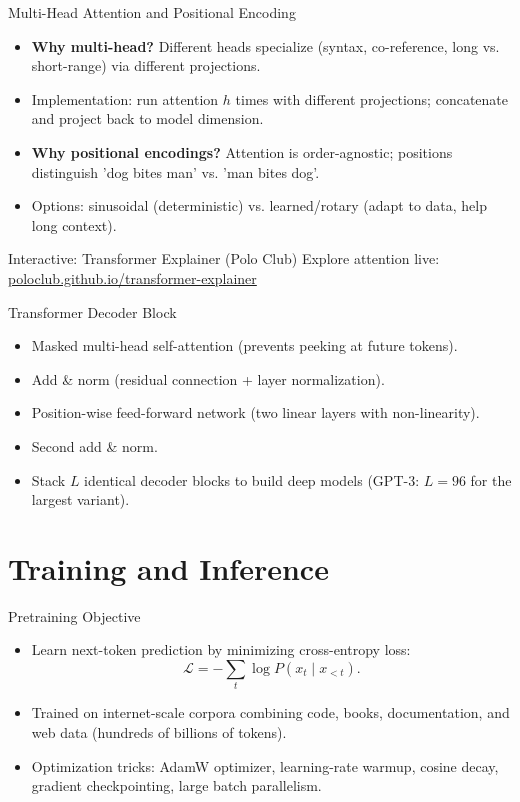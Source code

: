 \documentclass[aspectratio=169]{beamer}
\begin{document}
\begin{frame}{Multi-Head Attention and Positional Encoding}
  \begin{itemize}
    \item \textbf{Why multi-head?} Different heads specialize (syntax, co-reference, long vs. short-range) via different projections.
    \item Implementation: run attention $h$ times with different projections; concatenate and project back to model dimension.
    \item \textbf{Why positional encodings?} Attention is order-agnostic; positions distinguish 'dog bites man' vs. 'man bites dog'.
    \item Options: sinusoidal (deterministic) vs. learned/rotary (adapt to data, help long context).
  \end{itemize}
\end{frame}
\begin{frame}{Interactive: Transformer Explainer (Polo Club)}
  Explore attention live: \href{https://poloclub.github.io/transformer-explainer/}{poloclub.github.io/transformer-explainer}
\end{frame}

\begin{frame}{Transformer Decoder Block}
  \begin{itemize}
    \item Masked multi-head self-attention (prevents peeking at future tokens).
    \item Add \& norm (residual connection + layer normalization).
    \item Position-wise feed-forward network (two linear layers with non-linearity).
    \item Second add \& norm.
    \item Stack $L$ identical decoder blocks to build deep models (GPT-3: $L=96$ for the largest variant).
  \end{itemize}
\end{frame}

\section{Training and Inference}

\begin{frame}{Pretraining Objective}
  \begin{itemize}
    \item Learn next-token prediction by minimizing cross-entropy loss:
      \[
        \mathcal{L} = -\sum_{t} \log P(x_t \mid x_{<t}).
      \]
    \item Trained on internet-scale corpora combining code, books, documentation, and web data (hundreds of billions of tokens).
    \item Optimization tricks: AdamW optimizer, learning-rate warmup, cosine decay, gradient checkpointing, large batch parallelism.
  \end{itemize}
\end{frame}
\end{document}
